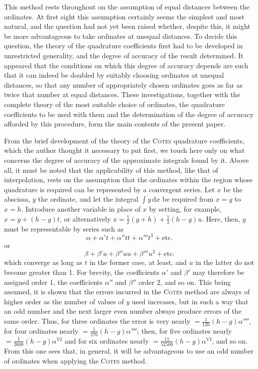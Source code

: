 This method rests throughout on the assumption of equal distances between the ordinates. At first sight this assumption certainly seems the simplest and most natural, and the question had not yet been raised whether, despite this, it might be more advantageous to take ordinates at unequal distances. To decide this question, the theory of the quadrature coefficients first had to be developed in unrestricted generality, and the degree of accuracy of the result determined. It appeared that the conditions on which this degree of accuracy depends are such that it can indeed be doubled by suitably choosing ordinates at unequal distances, so that any number of appropriately chosen ordinates goes as far as twice that number at equal distances. These investigations, together with the complete theory of the most suitable choice of ordinates, the quadrature coefficients to be used with them and the determination of the degree of accuracy afforded by this procedure, form the main contents of the present paper.

From the brief development of the theory of the \textsc{Cotes} quadrature coefficients, which the author thought it necessary to put first, we touch here only on what concerns the degree of accuracy of the approximate integrals found by it. Above all, it must be noted that the applicability of this method, like that of interpolation, rests on the assumption that the ordinates within the region whose quadrature is required
can be represented by a convergent series. Let \(x\) be the abscissa, \(y\) the ordinate, and let the integral \(\int y\,\mathrm{d}x\) be required from \(x=g\) to \(x=h\). Introduce another variable in place of \(x\) by setting, for example, \(x=g+(h-g)t\), or alternatively \(x=\frac12(g+h)+\frac12(h-g)u\). Here, then, \(y\) must be representable by series such as
\[
\alpha+\alpha't+\alpha''tt+\alpha'''t^3+\text{etc.}
\]
or
\[
\beta+\beta'u+\beta''uu+\beta'''u^3+\text{etc.}
\]
which converge as long as \(t\) in the former case, at least, and \(u\) in the latter do not become greater than 1. For brevity, the coefficients \(\alpha'\) and \(\beta'\) may therefore be assigned order 1, the coefficients \(\alpha''\) and \(\beta''\) order 2, and so on. This being assumed, it is shown that the errors incurred in the \textsc{Cotes} method are always of higher order as the number of values of \(y\) used increases, but in such a way that an odd number and the next larger even number always produce errors of the same order. Thus, for three ordinates the error is very nearly \(=\frac{1}{120}(h-g)\alpha''''\), for four ordinates nearly \(=\frac{1}{270}(h-g)\alpha''''\); then, for five ordinates nearly \(=\frac{1}{2688}(h-g)\alpha^{\mathrm{VI}}\) and for six ordinates nearly \(=\frac{11}{52500}(h-g)\alpha^{\mathrm{VI}}\), and so on. From this one sees that, in general, it will be advantageous to use an odd number of ordinates when applying the \textsc{Cotes} method.


